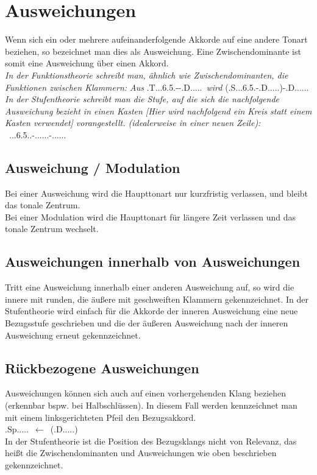 \documentclass[a4paper]{article}
\newcommand{\dS}[1]{\HH.\uppercase\expandafter{\romannumeral #1\relax}.....} %
\newcommand{\mShoch}[4]{\HH.\romannumeral #1..#2.#3.#4.} %
\newcommand{\bel}[5]{\HH.#1.#5.#2.#3.#4.}
\newcommand{\Sp}{\HH.Sp.....}
\newcommand{\D}{\HH.D.....}
\begin{document}
	\section{Ausweichungen}
	Wenn sich ein oder mehrere aufeinanderfolgende Akkorde auf eine andere Tonart beziehen, so bezeichnet man dies als Ausweichung. Eine Zwischendominante ist somit eine Ausweichung über einen Akkord.\\
	\textit{In der Funktionstheorie schreibt man, ähnlich wie Zwischendominanten, die Funktionen zwischen Klammern: Aus} \bel{T}{}{6}{5}{}-\DD-\D\ \textit{wird} (\bel{S}{}{6}{5}{}-\D)-\D.
	\textit{In der Stufentheorie schreibt man die Stufe, auf die sich die nachfolgende Ausweichung bezieht in einen Kasten [Hier wird nachfolgend ein Kreis statt einem Kasten verwendet] vorangestellt. (idealerweise in einer neuen Zeile):} \Kr{\dS{5}:}\ \mShoch{2}{6}{5}{}-\dS{5}-\dS{1}
	
	\subsection{Ausweichung / Modulation}
	Bei einer Ausweichung wird die Haupttonart nur kurzfristig verlassen, und bleibt das tonale Zentrum.\\
	Bei einer Modulation wird die Haupttonart für längere Zeit verlassen und das tonale Zentrum wechselt.
	
	\subsection{Ausweichungen innerhalb von Ausweichungen}
	Tritt eine Ausweichung innerhalb einer anderen Ausweichung auf, so wird die innere mit runden, die äußere mit geschweiften Klammern gekennzeichnet. In der Stufentheorie wird einfach für die Akkorde der inneren Ausweichung eine neue Bezugsstufe geschrieben und die der äußeren Ausweichung nach der inneren Ausweichung erneut gekennzeichnet.
	
	\subsection{Rückbezogene Ausweichungen}
	Ausweichungen können sich auch auf einen vorhergehenden Klang beziehen (erkennbar bspw. bei Halbschlüssen). In diesem Fall werden kennzeichnet man mit einem linksgerichteten Pfeil den Bezugsakkord.\\
	\Sp\  $\leftarrow$\ (\D)\\
	In der Stufentheorie ist die Position des Bezugsklangs nicht von Relevanz, das heißt die Zwischendominanten und Ausweichungen wie oben beschrieben gekennzeichnet. 
	
\end{document}
